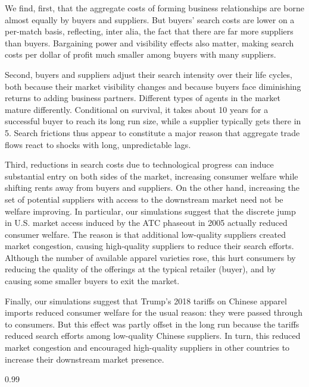 \documentclass[12pt]{article} \usepackage{amsmath,amssymb,amsthm,geometry,graphicx,setspace,algorithm,algpseudocode,float}
\begin{document}
We find, first, that the aggregate costs of forming business relationships
are borne almost equally by buyers and suppliers. But buyers' search costs are
lower on a per-match basis, reflecting, inter alia, the fact that there are
far more suppliers than buyers. Bargaining power and visibility effects also matter, making search costs per dollar of profit much smaller among buyers with many suppliers.

Second, buyers and suppliers adjust their search intensity over their life
cycles, both because their market visibility changes and because buyers face diminishing returns to adding business partners. Different types of agents in the market mature differently. Conditional on survival, it takes about 10 years for a successful buyer to reach its long run size, while a supplier typically gets there in 5. Search frictions thus appear to constitute a major reason that aggregate trade flows react to shocks with long, unpredictable lags.

Third, reductions in search costs due to technological progress can induce substantial entry on both sides of the market, increasing consumer welfare while shifting rents away from buyers and suppliers. On the other hand, increasing the set of potential suppliers with access to the downstream market need not be welfare improving. In particular, our simulations suggest that the discrete jump in U.S. market access induced by the ATC phaseout in 2005 actually reduced consumer welfare. The reason is that additional low-quality suppliers created market congestion, causing high-quality suppliers to reduce their search efforts. Although the number of available apparel varieties rose, this hurt consumers by reducing the quality of the offerings at the typical retailer (buyer), and by causing some smaller buyers to exit the market.

Finally, our simulations suggest that Trump's 2018 tariffs on Chinese apparel imports reduced consumer welfare for the usual reason: they were passed through to consumers. But this effect was partly offset in the long run because the tariffs reduced search efforts among low-quality Chinese suppliers. In turn, this reduced market congestion and encouraged high-quality suppliers in other countries to increase their downstream market presence. 

\begin{spacing}{0.99}
%

\end{spacing}
\appendix\pagebreak
\end{document}
